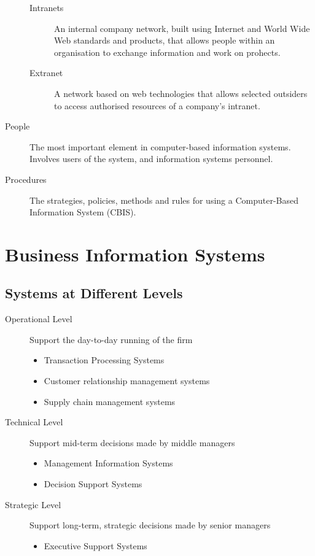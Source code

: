 \documentclass[\main/notes.tex]{subfiles}
\begin{document}
\begin{description}
\begin{description}
								\item[Intranets] An internal company network, built using Internet and World Wide Web standards and products, that allows people within an organisation to exchange information and work on prohects.
								\item[Extranet] A network based on web technologies that allows selected outsiders to access authorised resources of a company's intranet.
							\end{description}
						\item[People] The most important element in computer-based information systems. Involves users of the system, and information systems personnel.
						\item[Procedures] The strategies, policies, methods and rules for using a Computer-Based Information System (CBIS). 
					\end{description}
		\pagebreak
		\section{Business Information Systems}
			\subsection{Systems at Different Levels}
					\begin{description}
						\item[Operational Level] Support the day-to-day running of the firm
							\begin{itemize}
								\item Transaction Processing Systems
								\item Customer relationship management systems
								\item Supply chain management systems
							\end{itemize}
						\item[Technical Level] Support mid-term decisions made by middle managers
							\begin{itemize}
								\item Management Information Systems
								\item Decision Support Systems
							\end{itemize}
						\item[Strategic Level] Support long-term, strategic decisions made by senior managers
							\begin{itemize}
								\item Executive Support Systems
							\end{itemize}
					\end{description}
\end{document}
